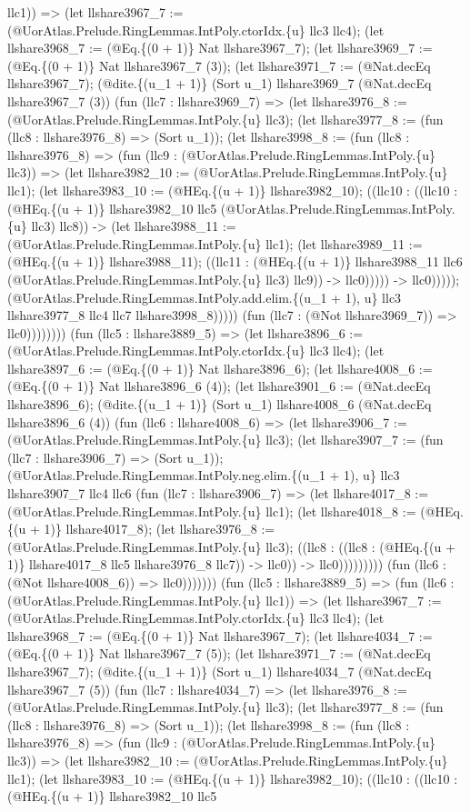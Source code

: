 \documentclass[11pt]{article}
\begin{document}
llc1)) => (let llshare3967\_7 := (@UorAtlas.Prelude.RingLemmas.IntPoly.ctorIdx.\{u\} llc3 llc4); (let llshare3968\_7 := (@Eq.\{(0 + 1)\} Nat llshare3967\_7); (let llshare3969\_7 := (@Eq.\{(0 + 1)\} Nat llshare3967\_7 (3)); (let llshare3971\_7 := (@Nat.decEq llshare3967\_7); (@dite.\{(u\_1 + 1)\} (Sort u\_1) llshare3969\_7 (@Nat.decEq llshare3967\_7 (3)) (fun (llc7 : llshare3969\_7) => (let llshare3976\_8 := (@UorAtlas.Prelude.RingLemmas.IntPoly.\{u\} llc3); (let llshare3977\_8 := (fun (llc8 : llshare3976\_8) => (Sort u\_1)); (let llshare3998\_8 := (fun (llc8 : llshare3976\_8) => (fun (llc9 : (@UorAtlas.Prelude.RingLemmas.IntPoly.\{u\} llc3)) => (let llshare3982\_10 := (@UorAtlas.Prelude.RingLemmas.IntPoly.\{u\} llc1); (let llshare3983\_10 := (@HEq.\{(u + 1)\} llshare3982\_10); ((llc10 : ((llc10 : (@HEq.\{(u + 1)\} llshare3982\_10 llc5 (@UorAtlas.Prelude.RingLemmas.IntPoly.\{u\} llc3) llc8)) -> (let llshare3988\_11 := (@UorAtlas.Prelude.RingLemmas.IntPoly.\{u\} llc1); (let llshare3989\_11 := (@HEq.\{(u + 1)\} llshare3988\_11); ((llc11 : (@HEq.\{(u + 1)\} llshare3988\_11 llc6 (@UorAtlas.Prelude.RingLemmas.IntPoly.\{u\} llc3) llc9)) -> llc0))))) -> llc0))))); (@UorAtlas.Prelude.RingLemmas.IntPoly.add.elim.\{(u\_1 + 1), u\} llc3 llshare3977\_8 llc4 llc7 llshare3998\_8))))) (fun (llc7 : (@Not llshare3969\_7)) => llc0)))))))) (fun (llc5 : llshare3889\_5) => (let llshare3896\_6 := (@UorAtlas.Prelude.RingLemmas.IntPoly.ctorIdx.\{u\} llc3 llc4); (let llshare3897\_6 := (@Eq.\{(0 + 1)\} Nat llshare3896\_6); (let llshare4008\_6 := (@Eq.\{(0 + 1)\} Nat llshare3896\_6 (4)); (let llshare3901\_6 := (@Nat.decEq llshare3896\_6); (@dite.\{(u\_1 + 1)\} (Sort u\_1) llshare4008\_6 (@Nat.decEq llshare3896\_6 (4)) (fun (llc6 : llshare4008\_6) => (let llshare3906\_7 := (@UorAtlas.Prelude.RingLemmas.IntPoly.\{u\} llc3); (let llshare3907\_7 := (fun (llc7 : llshare3906\_7) => (Sort u\_1)); (@UorAtlas.Prelude.RingLemmas.IntPoly.neg.elim.\{(u\_1 + 1), u\} llc3 llshare3907\_7 llc4 llc6 (fun (llc7 : llshare3906\_7) => (let llshare4017\_8 := (@UorAtlas.Prelude.RingLemmas.IntPoly.\{u\} llc1); (let llshare4018\_8 := (@HEq.\{(u + 1)\} llshare4017\_8); (let llshare3976\_8 := (@UorAtlas.Prelude.RingLemmas.IntPoly.\{u\} llc3); ((llc8 : ((llc8 : (@HEq.\{(u + 1)\} llshare4017\_8 llc5 llshare3976\_8 llc7)) -> llc0)) -> llc0))))))))) (fun (llc6 : (@Not llshare4008\_6)) => llc0))))))) (fun (llc5 : llshare3889\_5) => (fun (llc6 : (@UorAtlas.Prelude.RingLemmas.IntPoly.\{u\} llc1)) => (let llshare3967\_7 := (@UorAtlas.Prelude.RingLemmas.IntPoly.ctorIdx.\{u\} llc3 llc4); (let llshare3968\_7 := (@Eq.\{(0 + 1)\} Nat llshare3967\_7); (let llshare4034\_7 := (@Eq.\{(0 + 1)\} Nat llshare3967\_7 (5)); (let llshare3971\_7 := (@Nat.decEq llshare3967\_7); (@dite.\{(u\_1 + 1)\} (Sort u\_1) llshare4034\_7 (@Nat.decEq llshare3967\_7 (5)) (fun (llc7 : llshare4034\_7) => (let llshare3976\_8 := (@UorAtlas.Prelude.RingLemmas.IntPoly.\{u\} llc3); (let llshare3977\_8 := (fun (llc8 : llshare3976\_8) => (Sort u\_1)); (let llshare3998\_8 := (fun (llc8 : llshare3976\_8) => (fun (llc9 : (@UorAtlas.Prelude.RingLemmas.IntPoly.\{u\} llc3)) => (let llshare3982\_10 := (@UorAtlas.Prelude.RingLemmas.IntPoly.\{u\} llc1); (let llshare3983\_10 := (@HEq.\{(u + 1)\} llshare3982\_10); ((llc10 : ((llc10 : (@HEq.\{(u + 1)\} llshare3982\_10 llc5 
\end{document}
